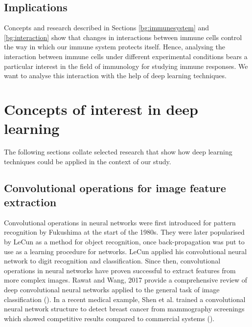 \subsection{Implications}

Concepts and research described in Sections \ref{bg:immunesystem} and \ref{bg:interaction} show that changes in interactions between immune cells control the way in which our immune system protects itself. Hence, analysing the interaction between immune cells under different experimental conditions bears a particular interest in the field of immunology for studying immune responses. We want to analyse this interaction with the help of deep learning techniques.

\section{Concepts of interest in deep learning}

The following sections collate selected research that show how deep learning techniques could be applied in the context of our study.

\subsection{Convolutional operations for image feature extraction}

Convolutional operations in neural networks were first introduced for pattern recognition by Fukushima at the start of the 1980s. They were later popularised by LeCun as a method for object recognition, once back-propagation was put to use as a learning procedure for networks. LeCun applied his convolutional neural network to digit recognition and classification. Since then, convolutional operations in neural networks have proven successful to extract features from more complex images. Rawat and Wang, 2017 provide a comprehensive review of deep convolutional neural networks applied to the general task of image classification (\cite{https://www.mitpressjournals.org/doi/full/10.1162/neco_a_00990}). In a recent medical example, Shen et al. trained a convolutional neural network structure to detect breast cancer from mammography screenings which showed competitive results compared to commercial systems (\cite{https://www.nature.com/articles/s41598-019-48995-4}).

